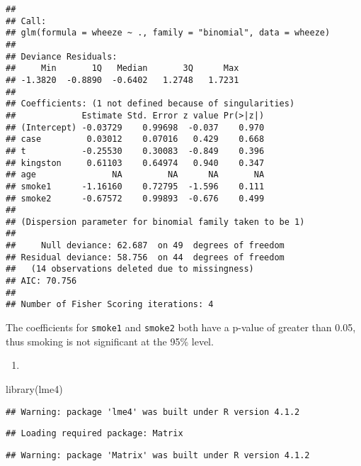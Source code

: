 \documentclass[
]{article}
\newenvironment{Shaded}{\begin{snugshade}}{\end{snugshade}}
\newcommand{\AttributeTok}[1]{\textcolor[rgb]{0.77,0.63,0.00}{#1}}
\newcommand{\DecValTok}[1]{\textcolor[rgb]{0.00,0.00,0.81}{#1}}
\newcommand{\FunctionTok}[1]{\textcolor[rgb]{0.00,0.00,0.00}{#1}}
\newcommand{\NormalTok}[1]{#1}
\newcommand{\OtherTok}[1]{\textcolor[rgb]{0.56,0.35,0.01}{#1}}
\newcommand{\SpecialCharTok}[1]{\textcolor[rgb]{0.00,0.00,0.00}{#1}}
\newcommand{\StringTok}[1]{\textcolor[rgb]{0.31,0.60,0.02}{#1}}
\providecommand{\tightlist}{%
  \setlength{\itemsep}{0pt}\setlength{\parskip}{0pt}}
\begin{document}
\begin{verbatim}
## 
## Call:
## glm(formula = wheeze ~ ., family = "binomial", data = wheeze)
## 
## Deviance Residuals: 
##     Min       1Q   Median       3Q      Max  
## -1.3820  -0.8890  -0.6402   1.2748   1.7231  
## 
## Coefficients: (1 not defined because of singularities)
##             Estimate Std. Error z value Pr(>|z|)
## (Intercept) -0.03729    0.99698  -0.037    0.970
## case         0.03012    0.07016   0.429    0.668
## t           -0.25530    0.30083  -0.849    0.396
## kingston     0.61103    0.64974   0.940    0.347
## age               NA         NA      NA       NA
## smoke1      -1.16160    0.72795  -1.596    0.111
## smoke2      -0.67572    0.99893  -0.676    0.499
## 
## (Dispersion parameter for binomial family taken to be 1)
## 
##     Null deviance: 62.687  on 49  degrees of freedom
## Residual deviance: 58.756  on 44  degrees of freedom
##   (14 observations deleted due to missingness)
## AIC: 70.756
## 
## Number of Fisher Scoring iterations: 4
\end{verbatim}

The coefficients for \texttt{smoke1} and \texttt{smoke2} both have a
p-value of greater than 0.05, thus smoking is not significant at the
95\% level.

\begin{enumerate}
\def\labelenumi{(\alph{enumi})}
\setcounter{enumi}{1}
\tightlist
\item
\end{enumerate}

\begin{Shaded}
\begin{Highlighting}[]
\FunctionTok{library}\NormalTok{(lme4)}
\end{Highlighting}
\end{Shaded}

\begin{verbatim}
## Warning: package 'lme4' was built under R version 4.1.2
\end{verbatim}

\begin{verbatim}
## Loading required package: Matrix
\end{verbatim}

\begin{verbatim}
## Warning: package 'Matrix' was built under R version 4.1.2
\end{verbatim}

\begin{Shaded}
\end{Shaded}
\end{document}
